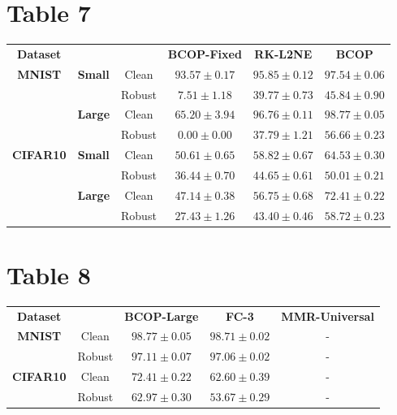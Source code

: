 \documentclass{article}%
\begin{document}
\section*{Table 7}%
\label{sec:Table7}%
\begin{tabularx}{\textwidth}{c|cc|ccc}%
\textbf{Dataset}&\textbf{}&\textbf{}&\textbf{BCOP-Fixed}&\textbf{RK-L2NE}&\textbf{BCOP}\\%
\cmidrule{1-6}%
\multirow{4}{*}{\textbf{{MNIST}}}&\multirow{2}{*}{\textbf{Small}}&Clean&$93.57\pm0.17$&$95.85\pm0.12$&$\mathbf{97.54}\pm0.06$\\%
&&Robust&$7.51\pm1.18$&$39.77\pm0.73$&$\mathbf{45.84}\pm0.90$\\%
\cmidrule{2-6}%
&\multirow{2}{*}{\textbf{Large}}&Clean&$65.20\pm3.94$&$96.76\pm0.11$&$\mathbf{98.77}\pm0.05$\\%
&&Robust&$0.00\pm0.00$&$37.79\pm1.21$&$\mathbf{56.66}\pm0.23$\\%
\cmidrule{1-6}%
\multirow{4}{*}{\textbf{{CIFAR10}}}&\multirow{2}{*}{\textbf{Small}}&Clean&$50.61\pm0.65$&$58.82\pm0.67$&$\mathbf{64.53}\pm0.30$\\%
&&Robust&$36.44\pm0.70$&$44.65\pm0.61$&$\mathbf{50.01}\pm0.21$\\%
\cmidrule{2-6}%
&\multirow{2}{*}{\textbf{Large}}&Clean&$47.14\pm0.38$&$56.75\pm0.68$&$\mathbf{72.41}\pm0.22$\\%
&&Robust&$27.43\pm1.26$&$43.40\pm0.46$&$\mathbf{58.72}\pm0.23$\\%
\cmidrule{1-6}%
\end{tabularx}

%
\section*{Table 8}%
\label{sec:Table8}%
\begin{tabularx}{\textwidth}{c|c|ccc}%
\textbf{Dataset}&&\textbf{BCOP-Large}&\textbf{FC-3}&\textbf{MMR-Universal}\\%
\cmidrule{1-5}%
\multirow{2}{*}{\textbf{{MNIST}}}&Clean&$\mathbf{98.77}\pm0.05$&$98.71\pm0.02$&{-}\\%
&Robust&$\mathbf{97.11}\pm0.07$&$97.06\pm0.02$&{-}\\%
\cmidrule{1-5}%
\multirow{2}{*}{\textbf{{CIFAR10}}}&Clean&$\mathbf{72.41}\pm0.22$&$62.60\pm0.39$&{-}\\%
&Robust&$\mathbf{62.97}\pm0.30$&$53.67\pm0.29$&{-}\\%
\cmidrule{1-5}%
\end{tabularx}
\end{document}
